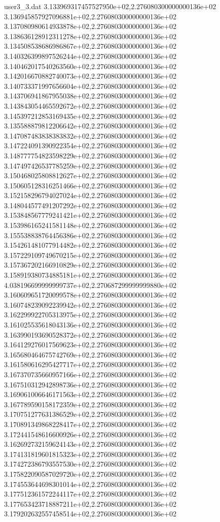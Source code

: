 \begin{filecontents}{user3_3.dat}
3.133969317457527950e+02,2.276080300000000136e+02
3.136945857927096881e+02,2.276080300000000136e+02
3.137080980614933878e+02,2.276080300000000136e+02
3.138636128912311278e+02,2.276080300000000136e+02
3.134508538686986867e+02,2.276080300000000136e+02
3.140326399897526244e+02,2.276080300000000136e+02
3.140462017540263560e+02,2.276080300000000136e+02
3.142016670882740073e+02,2.276080300000000136e+02
3.140733371997656604e+02,2.276080300000000136e+02
3.143706941867955038e+02,2.276080300000000136e+02
3.143843054465592672e+02,2.276080300000000136e+02
3.145397212853169435e+02,2.276080300000000136e+02
3.135588879812206642e+02,2.276080300000000136e+02
3.147087483838383832e+02,2.276080300000000136e+02
3.147224091390922354e+02,2.276080300000000136e+02
3.148777754823598229e+02,2.276080300000000136e+02
3.147497426537785259e+02,2.276080300000000136e+02
3.150468025808812627e+02,2.276080300000000136e+02
3.150605128316251466e+02,2.276080300000000136e+02
3.152158296794027024e+02,2.276080300000000136e+02
3.148044577491207292e+02,2.276080300000000136e+02
3.153848567779241421e+02,2.276080300000000136e+02
3.153986165241581148e+02,2.276080300000000136e+02
3.155538838764456386e+02,2.276080300000000136e+02
3.154261481077914482e+02,2.276080300000000136e+02
3.157229109749670215e+02,2.276080300000000136e+02
3.157367202166910829e+02,2.276080300000000136e+02
3.158919380734885181e+02,2.276080300000000136e+02
4.038196699999999737e+02,2.270687299999999880e+02
3.160609651720099578e+02,2.276080300000000136e+02
3.160748239092239942e+02,2.276080300000000136e+02
3.162299922705313975e+02,2.276080300000000136e+02
3.161025535618043136e+02,2.276080300000000136e+02
3.163990193690528372e+02,2.276080300000000136e+02
3.164129276017569623e+02,2.276080300000000136e+02
3.165680464675742769e+02,2.276080300000000136e+02
3.161580616295427717e+02,2.276080300000000136e+02
3.167370735660957166e+02,2.276080300000000136e+02
3.167510312942898736e+02,2.276080300000000136e+02
3.169061006646171563e+02,2.276080300000000136e+02
3.167789590158172359e+02,2.276080300000000136e+02
3.170751277631386529e+02,2.276080300000000136e+02
3.170891349868228417e+02,2.276080300000000136e+02
3.172441548616600926e+02,2.276080300000000136e+02
3.162692732159624143e+02,2.276080300000000136e+02
3.174131819601815323e+02,2.276080300000000136e+02
3.174272386793557530e+02,2.276080300000000136e+02
3.175822090587029720e+02,2.276080300000000136e+02
3.174553644698301014e+02,2.276080300000000136e+02
3.177512361572244117e+02,2.276080300000000136e+02
3.177653423718887211e+02,2.276080300000000136e+02
3.179202632557458514e+02,2.276080300000000136e+02

\end{filecontents}
